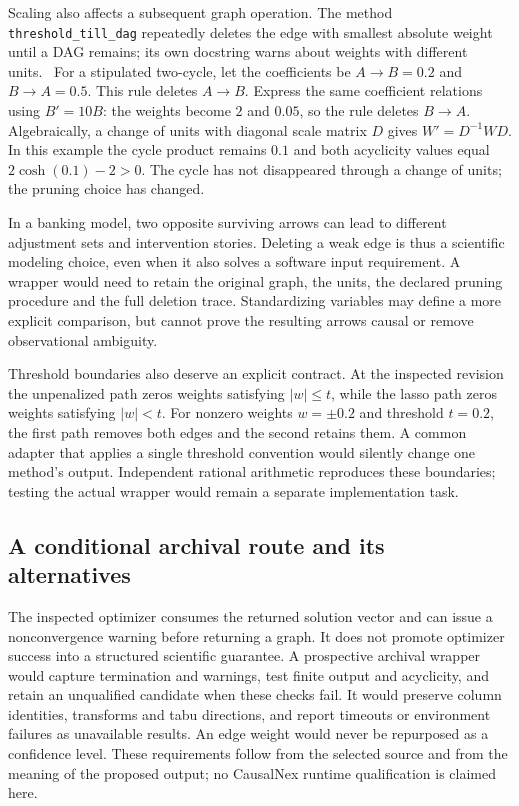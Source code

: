 Scaling also affects a subsequent graph operation. The method
\texttt{threshold\_till\_dag} repeatedly deletes the edge with smallest
absolute weight until a DAG remains; its own docstring warns about weights
with different units.~\citep{exec14_causalnex_primary}
For a stipulated two-cycle, let the coefficients be $A\to B=0.2$ and
$B\to A=0.5$. This rule deletes $A\to B$. Express the same coefficient
relations using $B'=10B$: the weights become $2$ and $0.05$, so the rule
deletes $B\to A$. Algebraically, a change of units with diagonal scale matrix
$D$ gives $W'=D^{-1}WD$. In this example the cycle product remains $0.1$ and
both acyclicity values equal $2\cosh(0.1)-2>0$. The cycle has not disappeared
through a change of units; the pruning choice has changed.
\citep{exec14_causalnex_oracle}

In a banking model, two opposite surviving arrows can lead to different
adjustment sets and intervention stories. Deleting a weak edge is thus a
scientific modeling choice, even when it also solves a software input
requirement. A wrapper would need to retain the original graph, the units,
the declared pruning procedure and the full deletion trace. Standardizing
variables may define a more explicit comparison, but cannot prove the
resulting arrows causal or remove observational ambiguity.

Threshold boundaries also deserve an explicit contract. At the inspected
revision the unpenalized path zeros weights satisfying
$|w|\leq t$, while the lasso path zeros weights satisfying $|w|<t$.
For nonzero weights $w=\pm0.2$ and threshold $t=0.2$, the first path removes
both edges and the second retains them. A common adapter that applies a
single threshold convention would silently change one method's output.
Independent rational arithmetic reproduces these boundaries; testing the
actual wrapper would remain a separate implementation task.
\citep{exec14_causalnex_primary,exec14_causalnex_oracle}

\subsection{A conditional archival route and its alternatives}

The inspected optimizer consumes the returned solution vector and can issue a
nonconvergence warning before returning a graph. It does not promote optimizer
success into a structured scientific guarantee. A prospective archival
wrapper would capture termination and warnings, test finite output and
acyclicity, and retain an unqualified candidate when these checks fail. It
would preserve column identities, transforms and tabu directions, and report
timeouts or environment failures as unavailable results. An edge weight would
never be repurposed as a confidence level. These requirements follow from
the selected source and from the meaning of the proposed output; no CausalNex
runtime qualification is claimed here.~\citep{exec14_causalnex_primary}

